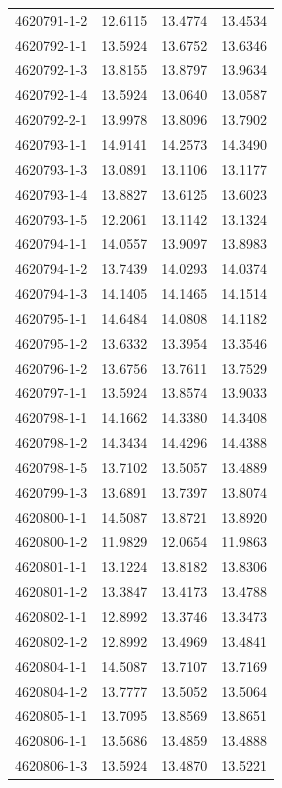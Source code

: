 \begin{longtable}{lrrr}
4620791-1-2 & 12.6115 & 13.4774 & 13.4534 \\
4620792-1-1 & 13.5924 & 13.6752 & 13.6346 \\
4620792-1-3 & 13.8155 & 13.8797 & 13.9634 \\
4620792-1-4 & 13.5924 & 13.0640 & 13.0587 \\
4620792-2-1 & 13.9978 & 13.8096 & 13.7902 \\
4620793-1-1 & 14.9141 & 14.2573 & 14.3490 \\
4620793-1-3 & 13.0891 & 13.1106 & 13.1177 \\
4620793-1-4 & 13.8827 & 13.6125 & 13.6023 \\
4620793-1-5 & 12.2061 & 13.1142 & 13.1324 \\
4620794-1-1 & 14.0557 & 13.9097 & 13.8983 \\
4620794-1-2 & 13.7439 & 14.0293 & 14.0374 \\
4620794-1-3 & 14.1405 & 14.1465 & 14.1514 \\
4620795-1-1 & 14.6484 & 14.0808 & 14.1182 \\
4620795-1-2 & 13.6332 & 13.3954 & 13.3546 \\
4620796-1-2 & 13.6756 & 13.7611 & 13.7529 \\
4620797-1-1 & 13.5924 & 13.8574 & 13.9033 \\
4620798-1-1 & 14.1662 & 14.3380 & 14.3408 \\
4620798-1-2 & 14.3434 & 14.4296 & 14.4388 \\
4620798-1-5 & 13.7102 & 13.5057 & 13.4889 \\
4620799-1-3 & 13.6891 & 13.7397 & 13.8074 \\
4620800-1-1 & 14.5087 & 13.8721 & 13.8920 \\
4620800-1-2 & 11.9829 & 12.0654 & 11.9863 \\
4620801-1-1 & 13.1224 & 13.8182 & 13.8306 \\
4620801-1-2 & 13.3847 & 13.4173 & 13.4788 \\
4620802-1-1 & 12.8992 & 13.3746 & 13.3473 \\
4620802-1-2 & 12.8992 & 13.4969 & 13.4841 \\
4620804-1-1 & 14.5087 & 13.7107 & 13.7169 \\
4620804-1-2 & 13.7777 & 13.5052 & 13.5064 \\
4620805-1-1 & 13.7095 & 13.8569 & 13.8651 \\
4620806-1-1 & 13.5686 & 13.4859 & 13.4888 \\
4620806-1-3 & 13.5924 & 13.4870 & 13.5221 \\

\end{longtable}

